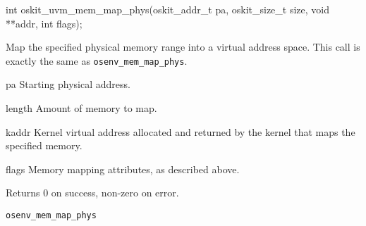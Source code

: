 \begin{apisyn}

        \funcproto int          oskit_uvm_mem_map_phys(oskit_addr_t pa, oskit_size_t size,
                                       void **addr, int flags);
\end{apisyn}
\begin{apidesc}
Map the specified physical memory range into a virtual address space.
This call is exactly the same as \texttt{osenv_mem_map_phys}.
\end{apidesc}
\begin{apiparm}
        \item[pa]
                Starting physical address.
        \item[length]
                Amount of memory to map.
        \item[kaddr]
                Kernel virtual address allocated and
                returned by the kernel that maps the
                specified memory.
        \item[flags]
                Memory mapping attributes, as described above.
\end{apiparm}
\begin{apiret}
        Returns 0 on success, non-zero on error.
\end{apiret}
\begin{apirel}
        {\tt osenv_mem_map_phys}
\end{apirel}

